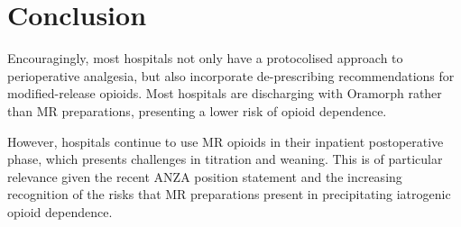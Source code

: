 \documentclass[11pt, a4paper]{article}
\begin{document}
\section*{Conclusion}
Encouragingly, most hospitals not only have a protocolised approach to perioperative analgesia, but also incorporate de-prescribing recommendations for modified-release opioids. Most hospitals are discharging with Oramorph rather than MR preparations, presenting a lower risk of opioid dependence.

However, hospitals continue to use MR opioids in their inpatient postoperative phase, which presents challenges in titration and weaning. This is of particular relevance given the recent ANZA position statement and the increasing recognition of the risks that MR preparations present in precipitating iatrogenic opioid dependence.\cite{Anonymous:2018is}




\end{document}
